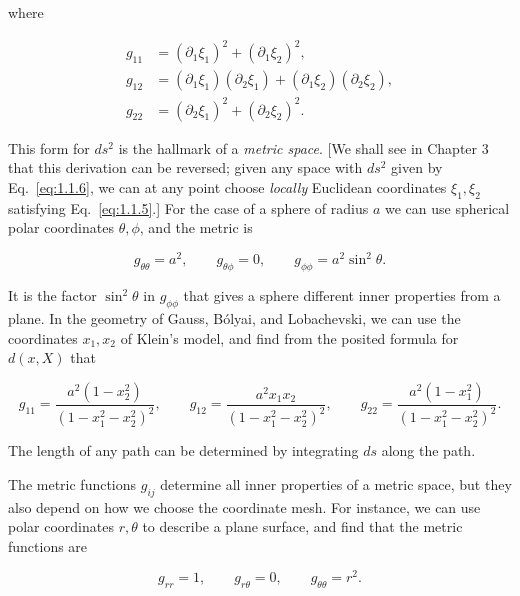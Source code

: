 where

\begin{equation}
  \begin{aligned}
    g_{11}&=(\partial_1\xi_1)^2+(\partial_1\xi_2)^2,\\
    g_{12}&=(\partial_1\xi_1)(\partial_2\xi_1)
            +(\partial_1\xi_2)(\partial_2\xi_2),\\
    g_{22}&=(\partial_2\xi_1)^2+(\partial_2\xi_2)^2.
  \end{aligned}
  \tag{1.1.7}\label{eq:1.1.7}
\end{equation}

This form for \(ds^2\) is the hallmark of a \emph{metric space}. [We shall see
in Chapter 3 that this derivation can be reversed; given any space with
\(ds^2\) given by Eq.~\eqref{eq:1.1.6}, we can at any point choose
\emph{locally} Euclidean coordinates \(\xi_1,\xi_2\) satisfying
Eq.~\eqref{eq:1.1.5}.] For the case of a sphere of radius \(a\) we can use
spherical polar coordinates \(\theta,\phi\), and the metric is

\begin{equation}
  g_{\theta\theta}=a^2,\qquad
  g_{\theta\phi}=0,\qquad
  g_{\phi\phi}=a^2\sin^2\theta.
  \tag{1.1.8}\label{eq:1.1.8}
\end{equation}

It is the factor \(\sin^2\theta\) in \(g_{\phi\phi}\) that gives a sphere
different inner properties from a plane. In the geometry of Gauss, B\'olyai,
and Lobachevski, we can use the coordinates \(x_1,x_2\) of Klein's model, and
find from the posited formula for \(d(x,X)\) that

\begin{equation}
  g_{11}=\frac{a^2(1-x_2^2)}{(1-x_1^2-x_2^2)^2},
  \qquad
  g_{12}=\frac{a^2x_1x_2}{(1-x_1^2-x_2^2)^2},
  \qquad
  g_{22}=\frac{a^2(1-x_1^2)}{(1-x_1^2-x_2^2)^2}.
  \tag{1.1.9}\label{eq:1.1.9}
\end{equation}

The length of any path can be determined by integrating \(ds\) along the
path.

The metric functions \(g_{ij}\) determine all inner properties of a metric
space, but they also depend on how we choose the coordinate mesh. For
instance, we can use polar coordinates \(r,\theta\) to describe a plane
surface, and find that the metric functions are

\begin{equation}
  g_{rr}=1,\qquad g_{r\theta}=0,\qquad g_{\theta\theta}=r^2.
  \tag{1.1.10}\label{eq:1.1.10}
\end{equation}

